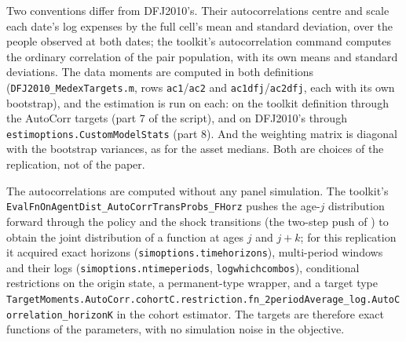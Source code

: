\documentclass[11pt,fleqn]{article}
\begin{document}
Two conventions differ from DFJ2010's. Their autocorrelations centre and scale each date's log expenses by the full cell's mean and standard deviation, over the people observed at both dates; the toolkit's autocorrelation command computes the ordinary correlation of the pair population, with its own means and standard deviations. The data moments are computed in both definitions (\texttt{DFJ2010\_MedexTargets.m}, rows \texttt{ac1}/\texttt{ac2} and \texttt{ac1dfj}/\texttt{ac2dfj}, each with its own bootstrap), and the estimation is run on each: on the toolkit definition through the AutoCorr targets (part 7 of the script), and on DFJ2010's through \texttt{estimoptions.CustomModelStats} (part 8). And the weighting matrix is diagonal with the bootstrap variances, as for the asset medians. Both are choices of the replication, not of the paper.

\begin{sloppypar}
The autocorrelations are computed without any panel simulation. The toolkit's \texttt{EvalFnOnAgentDist\_\allowbreak AutoCorrTransProbs\_FHorz} pushes the age-$j$ distribution forward through the policy and the shock transitions (the two-step push of \citet{Tan2020}) to obtain the joint distribution of a function at ages $j$ and $j+k$; for this replication it acquired exact horizons (\texttt{simoptions.timehorizons}), multi-period windows and their logs (\texttt{simoptions.ntimeperiods}, \texttt{logwhichcombos}), conditional restrictions on the origin state, a permanent-type wrapper, and a target type \texttt{TargetMoments.AutoCorr.cohortC.\allowbreak restriction.fn\_2periodAverage\_log.\allowbreak AutoCorrelation\_horizonK} in the cohort estimator. The targets are therefore exact functions of the parameters, with no simulation noise in the objective.
\end{sloppypar}
\end{document}
